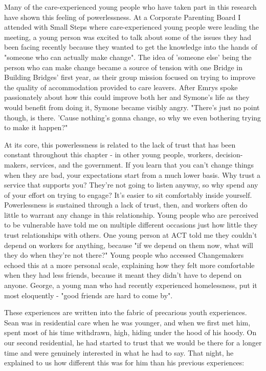 Many of the care-experienced young people who have taken part in this research have shown this feeling of powerlessness. At a Corporate Parenting Board I attended with Small Steps where care-experienced young people were leading the meeting, a young person was excited to talk about some of the issues they had been facing recently because they wanted to get the knowledge into the hands of "someone who can actually make change". The idea of 'someone else' being the person who can make change became a source of tension with one Bridge in Building Bridges' first year, as their group mission focused on trying to improve the quality of accommodation provided to care leavers. After Emrys spoke passionately about how this could improve both her and Symone's life as they would benefit from doing it, Symone became visibly angry. "There's just no point though, is there. 'Cause nothing's gonna change, so why we even bothering trying to make it happen?"

At its core, this powerlessness is related to the lack of trust that has been constant throughout this chapter - in other young people, workers, decision-makers, services, and the government. If you learn that you can't change things when they are bad, your expectations start from a much lower basis. Why trust a service that supports you? They're not going to listen anyway, so why spend any of your effort on trying to engage? It's easier to sit comfortably inside yourself. Powerlessness is sustained through a lack of trust, then, and workers often do little to warrant any change in this relationship. Young people who are perceived to be vulnerable have told me on multiple different occasions just how little they trust relationships with others. One young person at ACT told me they couldn't depend on workers for anything, because "if we depend on them now, what will they do when they're not there?" Young people who accessed Changemakers echoed this at a more personal scale, explaining how they felt more comfortable when they had less friends, because it meant they didn't have to depend on anyone. George, a young man who had recently experienced homelessness, put it most eloquently - "good friends are hard to come by".

These experiences are written into the fabric of precarious youth experiences. Sean was in residential care when he was younger, and when we first met him, spent most of his time withdrawn, high, hiding under the hood of his hoody. On our second residential, he had started to trust that we would be there for a longer time and were genuinely interested in what he had to say. That night, he explained to us how different this was for him than his previous experiences:

